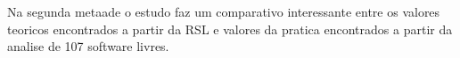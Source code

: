Na segunda metaade o estudo faz um comparativo interessante entre
os valores teoricos encontrados a partir da RSL e valores da pratica
encontrados a partir da analise de 107 software livres.

%
%
%
%
%
%
